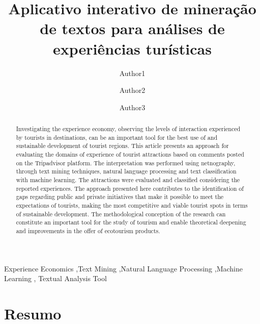 \documentclass[preprint, 3p,
authoryear]{elsarticle} %
\begin{document}
\begin{frontmatter}

  \title{Aplicativo interativo de mineração de textos para análises de
experiências turísticas}
    \author[Some Institute of Technology]{Author1%
  }
    \author[Another University]{Author2%
  }
    \author[Another University]{Author3%
  }
  
  \begin{abstract}
  Investigating the experience economy, observing the levels of
  interaction experienced by tourists in destinations, can be an
  important tool for the best use of and sustainable development of
  tourist regions. This article presents an approach for evaluating the
  domains of experience of tourist attractions based on comments posted
  on the Tripadvisor platform. The interpretation was performed using
  netnography, through text mining techniques, natural language
  processing and text classification with machine learning. The
  attractions were evaluated and classified considering the reported
  experiences. The approach presented here contributes to the
  identification of gaps regarding public and private initiatives that
  make it possible to meet the expectations of tourists, making the most
  competitive and viable tourist spots in terms of sustainable
  development. The methodological conception of the research can
  constitute an important tool for the study of tourism and enable
  theoretical deepening and improvements in the offer of ecotourism
  products.
  \end{abstract}
    \begin{keyword}
    Experience Economics \sep Text Mining \sep Natural Language
Processing \sep Machine Learning \sep 
    Textual Analysis Tool
  \end{keyword}
  
 \end{frontmatter}

\hypertarget{resumo}{%
\section{Resumo}\label{resumo}}
\end{document}
